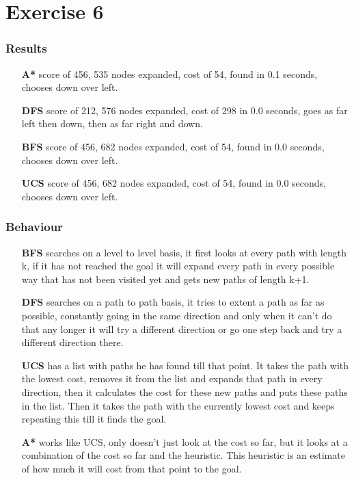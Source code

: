 \newpage{}
\section{Exercise 6}
\subsubsection{Results}
\begin{itemize}
\item [\textbf{A*}] score of 456, 535 nodes expanded, cost of 54, found in 0.1 seconds, chooses down over left.
\item [\textbf{DFS}] score of 212, 576 nodes expanded, cost of 298 in 0.0 seconds, goes as far left then down, then as far right and down.
\item [\textbf{BFS}] score of 456, 682 nodes expanded, cost of 54, found in 0.0 seconds, chooses down over left.
\item [\textbf{UCS}] score of 456, 682 nodes expanded, cost of 54, found in 0.0 
seconds, chooses down over left.
\end{itemize}

\subsubsection{Behaviour}
\begin{itemize}
\item [\textbf{BFS}] searches on a level to level basis, it first looks at every path with length k, if it has not reached the goal 
it will expand every path in every possible way that has not been visited yet and gets new paths of length k+1.
\item [\textbf{DFS}] searches on a path to path basis, it tries to extent a path as far as possible, constantly going in the same direction
and only when it can't do that any longer it will try a different direction or go one step back and try a different direction there.
\item [\textbf{UCS}] has a list with paths he has found till that point. It takes the path with the lowest cost, removes it from the list 
and expands that path in every direction, then it calculates the cost for these new paths and puts these paths in the list. 
Then it takes the path with the currently lowest cost and keeps repeating this till it finds the goal.
\item [\textbf{A*}] works like UCS, only doesn't just look at the cost so far, but it looks at a combination of the cost so far and the heuristic.
This heuristic is an estimate of how much it will cost from that point to the goal.
\end{itemize}

